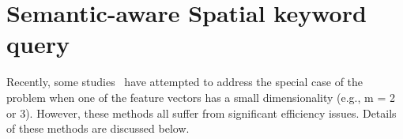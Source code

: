 







\section{Semantic-aware Spatial keyword query}
\label{sec:appendix-stkq}
Recently, some studies~\cite{chenS2RtreePivotbasedIndexing2020, qianSemanticawareTopkSpatial2018, DBLP:conf/edbt/TheodoropoulosN24} have attempted to address the special case of the \hvq problem when one of the feature vectors has a small dimensionality (e.g., m = 2 or 3). However, these methods all suffer from significant efficiency issues. Details of these methods are discussed below.



